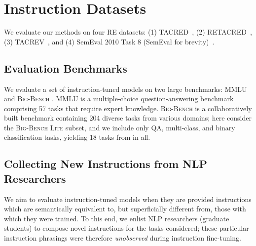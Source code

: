 \section{Instruction Datasets}
We evaluate our methods on four RE datasets:
(1) TACRED~\cite{Zhang2017TACRED},
(2) RETACRED~\cite{Stoica2021RETACRED},
(3) TACREV~\cite{Alt2020TACREV}, and
(4) SemEval 2010 Task 8 (SemEval for brevity)~\cite{Iris2010SemEval}.
\subsection{Evaluation Benchmarks}

We evaluate a set of instruction-tuned models on two large benchmarks: \textsc{MMLU} \cite{hendrycks2020measuring} and \textsc{Big-Bench} \cite{srivastava2022beyond}. \textsc{MMLU} is a multiple-choice question-answering benchmark comprising 57 tasks that require expert knowledge.
\textsc{Big-Bench} is a collaboratively built benchmark containing 204 diverse tasks from various domains; here %
consider the \textsc{Big-Bench Lite} subset, and we include only QA, multi-class, and binary classification tasks, yielding 18 tasks from in all. %


\subsection{Collecting New Instructions from NLP Researchers}
\label{section:new-instructions}

We aim to evaluate instruction-tuned models when they are provided instructions which are semantically equivalent to, but superficially different from, those with which they were trained.
To this end, we enlist NLP researchers (graduate students) to compose novel instructions for the tasks considered; these particular instruction phrasings were therefore \emph{unobserved} during instruction fine-tuning.



